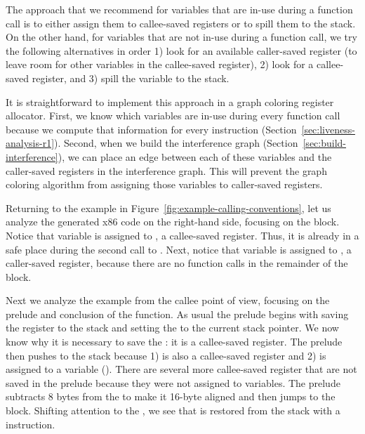 \documentclass[11pt]{book}
\begin{document}
The approach that we recommend for variables that are in-use during a
function call is to either assign them to callee-saved registers or to
spill them to the stack. On the other hand, for variables that are not
in-use during a function call, we try the following alternatives in
order 1) look for an available caller-saved register (to leave room
for other variables in the callee-saved register), 2) look for a
callee-saved register, and 3) spill the variable to the stack.

It is straightforward to implement this approach in a graph coloring
register allocator. First, we know which variables are in-use during
every function call because we compute that information for every
instruction (Section~\ref{sec:liveness-analysis-r1}). Second, when we
build the interference graph (Section~\ref{sec:build-interference}),
we can place an edge between each of these variables and the
caller-saved registers in the interference graph. This will prevent
the graph coloring algorithm from assigning those variables to
caller-saved registers.

Returning to the example in
Figure~\ref{fig:example-calling-conventions}, let us analyze the
generated x86 code on the right-hand side, focusing on the
 block. Notice that variable  is assigned to
, a callee-saved register. Thus, it is already in a safe
place during the second call to . Next, notice that
variable  is assigned to , a caller-saved register,
because there are no function calls in the remainder of the block.

Next we analyze the example from the callee point of view, focusing on
the prelude and conclusion of the  function. As usual the
prelude begins with saving the  register to the stack and
setting the  to the current stack pointer. We now know why
it is necessary to save the : it is a callee-saved register.
The prelude then pushes  to the stack because 1) 
is also a callee-saved register and 2)  is assigned to a
variable (). There are several more callee-saved register that
are not saved in the prelude because they were not assigned to
variables. The prelude subtracts 8 bytes from the  to make
it 16-byte aligned and then jumps to the  block. Shifting
attention to the , we see that  is restored
from the stack with a  instruction.
\end{document}
